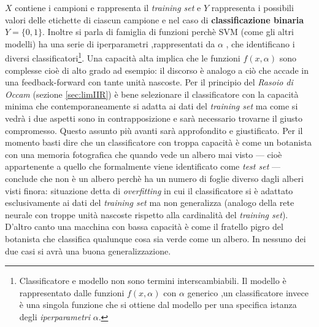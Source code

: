 $X$ contiene i campioni e rappresenta il \textit{training set} e $Y$ rappresenta i possibili valori delle etichette di ciascun campione e nel caso di \textbf{classificazione binaria} $Y=\{0,1\}$. Inoltre si parla di famiglia di funzioni perchè \ac{SVM} (come gli altri modelli) ha una serie di iperparametri ,rappresentati da $\alpha$ , che identificano i diversi classificatori\footnote{Classificatore e modello non sono termini interscambiabili. Il modello è rappresentato dalle funzioni $f(x,\alpha)$ con $\alpha$ generico ,un classificatore invece è una singola funzione che si ottiene dal modello per una specifica istanza degli \textit{iperparametri} $\alpha$.}.  Una capacità alta implica che le funzioni $f(x,\alpha)$ sono complesse cioè di alto grado ad esempio: il discorso è analogo a ciò che accade in una feedback-forward con tante unità nascoste. Per il principio del \textit{Rasoio di Occam} (sezione \ref{sec:limIIR}) è bene selezionare il classificatore con la capacità minima che contemporaneamente si adatta ai dati del \textit{training set} ma come si vedrà i due aspetti sono in contrapposizione e sarà necessario trovarne il giusto compromesso. Questo assunto più avanti sarà approfondito e giustificato. Per il momento basti dire che un classificatore con troppa capacità è come un botanista con una memoria fotografica che quando vede un albero mai visto --- cioè appartenente a quello che formalmente viene identificato come \textit{test set} --- conclude che non è un albero perchè ha un numero di foglie diverso dagli alberi visti finora: situazione detta di \textit{overfitting} in cui il classificatore si è adattato esclusivamente ai dati del \textit{training set} ma non generalizza (analogo della rete neurale con troppe unità nascoste rispetto alla cardinalità del \textit{training set}). D'altro canto una macchina con bassa capacità è come il fratello pigro del botanista  che classifica qualunque cosa sia verde come un albero. In nessuno dei due casi si avrà una buona generalizzazione.


